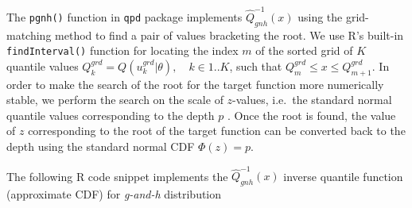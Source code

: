 \documentclass[
  12pt,
]{article}
\begin{document}
The \texttt{pgnh()} function in \texttt{qpd} package \citep{perepolkin2019QpdToolsQuantileparameterized} implements \(\widehat{Q}^{-1}_{gnh}(x)\) using the grid-matching method to find a pair of values bracketing the root. We use R's built-in \texttt{findInterval()} function for locating the index \(m\) of the sorted grid of \(K\) quantile values \(Q^{grd}_k=Q(u^{grd}_k|\theta), \quad k \in 1..K\), such that \(Q^{grd}_{m} \leq x \leq Q^{grd}_{m+1}\). In order to make the search of the root for the target function more numerically stable, we perform the search on the scale of \(z\)-values, i.e.~the standard normal quantile values corresponding to the depth \(p\) \citep{rayner2002NumericalMaximumLikelihood}. Once the root is found, the value of \(z\) corresponding to the root of the target function can be converted back to the depth using the standard normal CDF \(\Phi(z)=p\).

The following R code snippet implements the \(\widehat Q^{-1}_{gnh}(x)\) inverse quantile function (approximate CDF) for \emph{g-and-h} distribution
\end{document}
